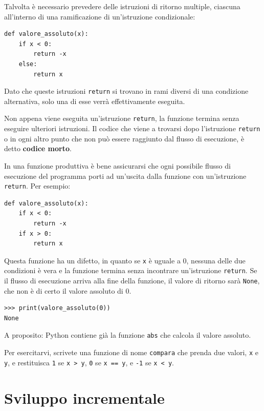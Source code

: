 \documentclass[10pt]{book}
\begin{document}
Talvolta è necessario prevedere delle istruzioni di ritorno multiple, ciascuna all'interno di una ramificazione di un'istruzione condizionale:

\begin{verbatim}
def valore_assoluto(x):
    if x < 0:
        return -x
    else:
        return x
\end{verbatim}
%
Dato che queste istruzioni {\tt return} si trovano in rami diversi di una
condizione alternativa, solo una di esse verrà effettivamente eseguita.

Non appena viene eseguita un'istruzione {\tt return}, la funzione termina senza eseguire ulteriori istruzioni. Il codice che viene a trovarsi dopo l'istruzione {\tt return} o in ogni altro punto che non può essere raggiunto dal flusso di esecuzione, è detto {\bf codice morto}.

In una funzione produttiva è bene assicurarsi che ogni possibile flusso di esecuzione del programma porti ad un'uscita dalla funzione con un'istruzione
{\tt return}. Per esempio:

\begin{verbatim}
def valore_assoluto(x):
    if x < 0:
        return -x
    if x > 0:
        return x
\end{verbatim}
%
Questa funzione ha un difetto, in quanto se {\tt x} è uguale a 0, nessuna delle due condizioni è vera e la funzione termina senza incontrare un'istruzione {\tt return}. Se il flusso di esecuzione arriva alla fine della funzione, il valore di ritorno sarà {\tt None}, che non è di certo il valore assoluto di 0.

\begin{verbatim}
>>> print(valore_assoluto(0))
None
\end{verbatim}
%
A proposito: Python contiene già la funzione {\tt abs} che calcola il valore assoluto.

Per esercitarvi, scrivete una funzione di nome {\tt compara} che prenda due valori, {\tt x} e {\tt y}, e restituisca
 {\tt 1} se {\tt x > y}, {\tt 0} se {\tt x == y}, e {\tt -1} se {\tt x < y}.


\section{Sviluppo incrementale}
\label{incremental.development}
\end{document}
